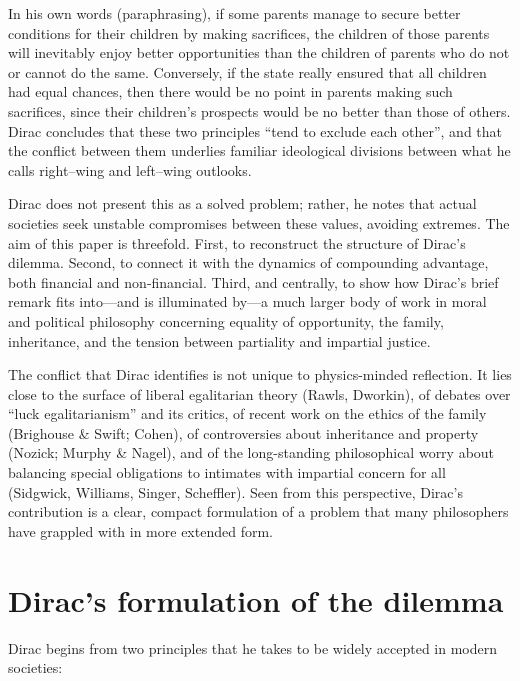 \documentclass[%
  reprint,
  superscriptaddress,
  amsmath,amssymb,
  pra,
  floatfix,
  longbibliography
]{revtex4-2}
\begin{document}
In his own words (paraphrasing), if some parents manage to secure
better conditions for their children by making sacrifices, the children
of those parents will inevitably enjoy better opportunities than the
children of parents who do not or cannot do the same.  Conversely, if
the state really ensured that all children had equal chances, then there
would be no point in parents making such sacrifices, since their
children's prospects would be no better than those of others.  Dirac
concludes that these two principles ``tend to exclude each other'', and
that the conflict between them underlies familiar ideological divisions
between what he calls right--wing and left--wing outlooks.

Dirac does not present this as a solved problem; rather, he notes that
actual societies seek unstable compromises between these values, avoiding
extremes.  The aim of this paper is threefold.  First, to reconstruct
the structure of Dirac's dilemma.  Second, to connect it with the
dynamics of compounding advantage, both financial and non-financial.
Third, and centrally, to show how Dirac's brief remark fits into---and
is illuminated by---a much larger body of work in moral and political
philosophy concerning equality of opportunity, the family, inheritance,
and the tension between partiality and impartial justice.

The conflict that Dirac identifies is not unique to physics-minded
reflection.  It lies close to the surface of liberal egalitarian theory
(Rawls, Dworkin), of debates over ``luck egalitarianism'' and its
critics, of recent work on the ethics of the family (Brighouse \&
Swift; Cohen), of controversies about inheritance and property
(Nozick; Murphy \& Nagel), and of the long-standing philosophical worry
about balancing special obligations to intimates with impartial concern
for all (Sidgwick, Williams, Singer, Scheffler).  Seen from this
perspective, Dirac's contribution is a clear, compact formulation of a
problem that many philosophers have grappled with in more extended form.

\section{Dirac's formulation of the dilemma}

Dirac begins from two principles that he takes to be widely accepted in
modern societies:
\end{document}
